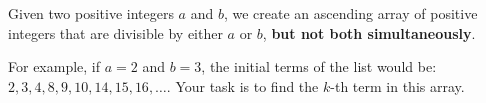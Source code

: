 Given two positive integers $a$ and $b$, we create an ascending array of positive integers that are divisible by either $a$ or $b$, \textbf{but not both simultaneously}.

For example, if $a=2$ and $b=3$, the initial terms of the list would be: $2, 3, 4, 8, 9, 10, 14, 15, 16, \ldots$.
Your task is to find the $k$-th term in this array.
